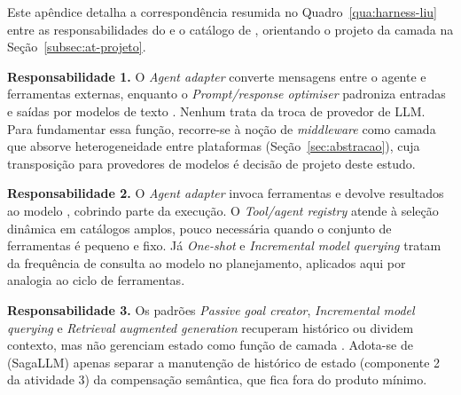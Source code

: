 \label{ap:delimitacao}

Este apêndice detalha a correspondência resumida no Quadro~\ref{qua:harness-liu}
entre as responsabilidades do \harness{} e o catálogo de ,
orientando o projeto da camada na Seção~\ref{subsec:at-projeto}.

\textbf{Responsabilidade 1.} O \textit{Agent adapter} converte mensagens entre o
agente e ferramentas externas, enquanto o \textit{Prompt/response optimiser}
padroniza entradas e saídas por modelos de texto \cite{liu2025}. Nenhum trata
da troca de provedor de LLM. Para fundamentar essa função, recorre-se à noção de
\textit{middleware} como camada que absorve heterogeneidade entre plataformas
\cite{issarny2007} (Seção~\ref{sec:abstracao}), cuja transposição para
provedores de modelos é decisão de projeto deste estudo.

\textbf{Responsabilidade 2.} O \textit{Agent adapter} invoca ferramentas e
devolve resultados ao modelo \cite{liu2025}, cobrindo parte da execução. O
\textit{Tool/agent registry} atende à seleção dinâmica em catálogos amplos,
pouco necessária quando o conjunto de ferramentas é pequeno e fixo. Já
\textit{One-shot} e \textit{Incremental model querying} tratam da frequência de
consulta ao modelo no planejamento, aplicados aqui por analogia ao ciclo de
ferramentas.

\textbf{Responsabilidade 3.} Os padrões \textit{Passive goal creator},
\textit{Incremental model querying} e \textit{Retrieval augmented generation}
recuperam histórico ou dividem contexto, mas não gerenciam estado como função
de camada \cite{liu2025}. Adota-se de  (SagaLLM) apenas
separar a manutenção de histórico de estado (componente 2 da atividade 3) da
compensação semântica, que fica fora do produto mínimo.

